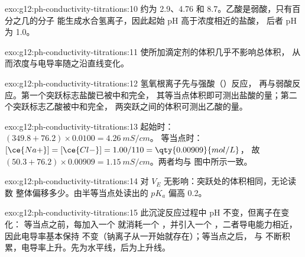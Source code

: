 \begin{solution}{exo:g12:ph-conductivity-titrations:10}
约为 2.9、4.76 和 8.7。乙酸是弱酸，只有百分之几的分子
能生成水合氢离子，因此起始 pH 高于浓度相近的盐酸，
后者 pH 为 1.0。
\end{solution}

\begin{solution}{exo:g12:ph-conductivity-titrations:11}
使所加滴定剂的体积几乎不影响总体积，
从而浓度与电导率随之沿直线变化。
\end{solution}

\begin{solution}{exo:g12:ph-conductivity-titrations:12}
氢氧根离子先与强酸（）反应，
再与弱酸反应。第一个突跃标志盐酸已被中和完全，
其等当点体积即可测出盐酸的量；第二个突跃标志乙酸被中和完全，
两突跃之间的体积可测出乙酸的量。
\end{solution}

\begin{solution}{exo:g12:ph-conductivity-titrations:13}
起始时：$(349.8 + 76.2) \times 0.0100 = \qty{4.26}{mS/cm}$。
等当点时：$[\ce{Na+}] = [\ce{Cl-}] = 1.00/110 = \qty{0.00909}{mol/L}$，
故 $(50.3 + 76.2) \times 0.00909 = \qty{1.15}{mS/cm}$。两者均与
图中所示一致。
\end{solution}

\begin{solution}{exo:g12:ph-conductivity-titrations:14}
对 $V_E$ 无影响：突跃处的体积相同，无论读数
整体偏移多少。由半等当点处读出的 $pK_a$ 偏高 0.2。
\end{solution}

\begin{solution}{exo:g12:ph-conductivity-titrations:15}
此沉淀反应过程中 pH 不变，但离子在变化：
等当点之前，每加入一个  就消耗一个 ，并引入一个
，二者导电能力相近，因此电导率基本保持
不变（钠离子从一开始就存在）；等当点之后， 与 
不断积累，电导率上升。先为水平线，后为上升线。
\end{solution}


